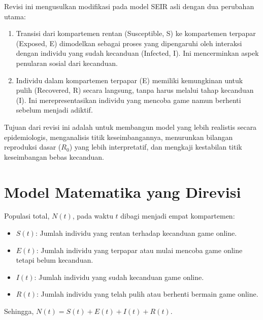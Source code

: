 \documentclass[12pt,a4paper]{article}
\begin{document}
Revisi ini mengusulkan modifikasi pada model SEIR asli dengan dua perubahan utama:
\begin{enumerate}
    \item Transisi dari kompartemen rentan (Susceptible, S) ke kompartemen terpapar (Exposed, E) dimodelkan sebagai proses yang dipengaruhi oleh interaksi dengan individu yang sudah kecanduan (Infected, I). Ini mencerminkan aspek penularan sosial dari kecanduan.
    \item Individu dalam kompartemen terpapar (E) memiliki kemungkinan untuk pulih (Recovered, R) secara langsung, tanpa harus melalui tahap kecanduan (I). Ini merepresentasikan individu yang mencoba game namun berhenti sebelum menjadi adiktif.
\end{enumerate}
Tujuan dari revisi ini adalah untuk membangun model yang lebih realistis secara epidemiologis, menganalisis titik keseimbangannya, menurunkan bilangan reproduksi dasar ($R_0$) yang lebih interpretatif, dan mengkaji kestabilan titik keseimbangan bebas kecanduan.

\section{Model Matematika yang Direvisi}
Populasi total, $N(t)$, pada waktu $t$ dibagi menjadi empat kompartemen:
\begin{itemize}
    \item $S(t)$: Jumlah individu yang rentan terhadap kecanduan game online.
    \item $E(t)$: Jumlah individu yang terpapar atau mulai mencoba game online tetapi belum kecanduan.
    \item $I(t)$: Jumlah individu yang sudah kecanduan game online.
    \item $R(t)$: Jumlah individu yang telah pulih atau berhenti bermain game online.
\end{itemize}
Sehingga, $N(t) = S(t) + E(t) + I(t) + R(t)$.
\end{document}
